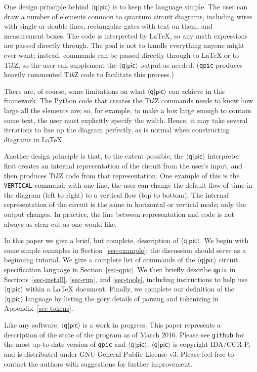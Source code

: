 \documentclass[twoside,12pt]{article}
\newcommand{\qpic}{$\langle\mathsf{q}|\mathsf{pic}\rangle$\xspace}
\newcommand{\qpicpy}{{\tt qpic}\xspace}
\newcommand{\TikZ}{Ti\emph{k}Z\xspace}
\begin{document}
One design principle behind \qpic is to keep the language simple.  The user can draw a number of
elements common to quantum circuit diagrams, including wires with single or double lines, rectangular
gates with text on them, and measurement boxes.  The code is interpreted by \LaTeX, so any math expressions
are passed directly through.  The goal is not to handle everything anyone might ever want; instead,
commands can be passed directly through to {\LaTeX} or to \TikZ, so the user can supplement the \qpic output
as needed.  (\qpicpy produces heavily commented \TikZ code to facilitate this process.)


There are, of course, some limitations on what \qpic can achieve in this framework.  The Python code
that creates the \TikZ commands needs to know how large all the elements are; so, for example, to make
a box large enough to contain some text, the user must explicitly specify the width.  Hence, it may
take several iterations to line up the diagram perfectly, as is normal when constructing diagrams in \LaTeX.


Another design principle is that, to the extent possible, the \qpic interpreter
first creates an internal representation
of the circuit from the user's input, and then produces \TikZ code from that representation.  One example
of this is the {\tt VERTICAL} command; with one line, the user can change the default flow of time in the
diagram (left to right) to a vertical flow (top to bottom).  The internal representation of the circuit is
the same in horizontal or vertical mode; only the output changes.  In practice, the line between
representation and code is not always as clear-cut as one would like.


In this paper we give a brief, but complete, description of \qpic.  We begin with some simple examples in
Section~\ref{sec-example}; the discussion should serve as a beginning tutorial.  
We give a complete list of commands of the \qpic circuit specification language
in Section~\ref{sec-qpic}.  We then briefly describe \qpicpy in Sections~\ref{sec-install}, \ref{sec-run}, and \ref{sec-tools}, including
instructions to help use \qpic within a {\LaTeX} document.  Finally, we complete our definition of the
\qpic language by listing the gory details of parsing and tokenizing in Appendix~\ref{sec-tokens}.

Like any software, \qpic is a work in progress.  This paper represents a description of the state of
the program as of March 2016.  Please see {\tt github} for the most up-to-date version of \qpicpy and \qpic.  \qpic is copyright IDA/CCR-P, and is distributed
under GNU General Public License v3. 
Please feel free to contact the authors with suggestions for further improvement.
\end{document}
